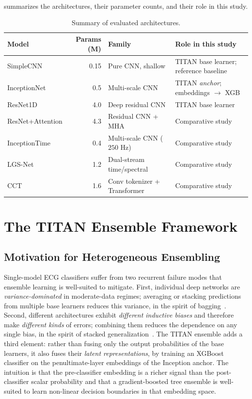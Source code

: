  summarizes the architectures, their parameter counts, and their role in this study.

\begin{table}[h]
\centering
\caption{Summary of evaluated architectures.}
\label{tab:arch-summary}
\small
\begin{tabularx}{\textwidth}{l r l X}
\toprule
\textbf{Model} & \textbf{Params (M)} & \textbf{Family} & \textbf{Role in this study} \\
\midrule
SimpleCNN          & 0.15 & Pure CNN, shallow           & TITAN base learner; reference baseline \\
InceptionNet       & 0.5  & Multi-scale CNN             & TITAN \emph{anchor}; embeddings $\to$ XGB \\
ResNet1D           & 4.0  & Deep residual CNN           & TITAN base learner \\
ResNet+Attention   & 4.3  & Residual CNN + MHA          & Comparative study \\
InceptionTime      & 0.4  & Multi-scale CNN ($250$ Hz)  & Comparative study \\
LGS-Net            & 1.2  & Dual-stream time/spectral   & Comparative study \\
CCT                & 1.6  & Conv tokenizer + Transformer & Comparative study \\
\bottomrule
\end{tabularx}
\end{table}

\section{The TITAN Ensemble Framework}

\subsection{Motivation for Heterogeneous Ensembling}

Single-model ECG classifiers suffer from two recurrent failure modes that ensemble learning is well-suited to mitigate. First, individual deep networks are \textit{variance-dominated} in moderate-data regimes; averaging or stacking predictions from multiple base learners reduces this variance, in the spirit of bagging~\cite{breiman1996bagging}. Second, different architectures exhibit \textit{different inductive biases} and therefore make \textit{different kinds} of errors; combining them reduces the dependence on any single bias, in the spirit of stacked generalization~\cite{wolpert1992stacked}. The TITAN ensemble adds a third element: rather than fusing only the output probabilities of the base learners, it also fuses their \textit{latent representations}, by training an XGBoost~\cite{chen2016xgboost} classifier on the penultimate-layer embeddings of the Inception anchor. The intuition is that the pre-classifier embedding is a richer signal than the post-classifier scalar probability and that a gradient-boosted tree ensemble is well-suited to learn non-linear decision boundaries in that embedding space.

